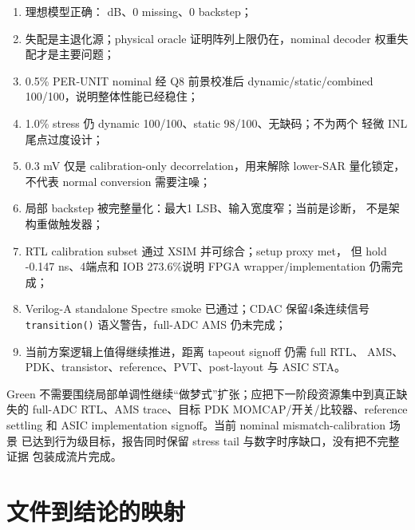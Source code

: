 \documentclass[UTF8,11pt,a4paper]{ctexart}
\newcommand{\code}[1]{\texttt{\small #1}}
\begin{document}
\begin{enumerate}
  \item 理想模型正确：\IdealCalSndr{} dB、0 missing、0 backstep；
  \item 失配是主退化源；physical oracle 证明阵列上限仍在，nominal decoder
    权重失配才是主要问题；
  \item 0.5\% PER-UNIT nominal 经 Q8 前景校准后 dynamic/static/combined
    100/100，说明整体性能已经稳住；
  \item 1.0\% stress 仍 dynamic 100/100、static 98/100、无缺码；不为两个
    轻微 INL 尾点过度设计；
  \item 0.3 mV 仅是 calibration-only decorrelation，用来解除 lower-SAR
    量化锁定，不代表 normal conversion 需要注噪；
  \item 局部 backstep 被完整量化：最大1 LSB、输入宽度窄；当前是诊断，
    不是架构重做触发器；
  \item RTL calibration subset 通过 XSIM 并可综合；setup proxy met，
    但 hold -0.147 ns、4端点和 IOB 273.6\%说明 FPGA wrapper/implementation
    仍需完成；
  \item Verilog-A standalone Spectre smoke 已通过；CDAC 保留4条连续信号
    \code{transition()} 语义警告，full-ADC AMS 仍未完成；
  \item 当前方案逻辑上值得继续推进，距离 tapeout signoff 仍需 full RTL、
    AMS、PDK、transistor、reference、PVT、post-layout 与 ASIC STA。
\end{enumerate}

\begin{verdictbox}[title=\textbf{最终工程判断}]{Green}
  不需要围绕局部单调性继续“做梦式”扩张；应把下一阶段资源集中到真正缺失的
  full-ADC RTL、AMS trace、目标 PDK MOMCAP/开关/比较器、reference settling
  和 ASIC implementation signoff。当前 nominal mismatch-calibration 场景
  已达到行为级目标，报告同时保留 stress tail 与数字时序缺口，没有把不完整证据
  包装成流片完成。
\end{verdictbox}

\appendix
\section[文件到结论映射]{文件到结论的映射}
\end{document}
